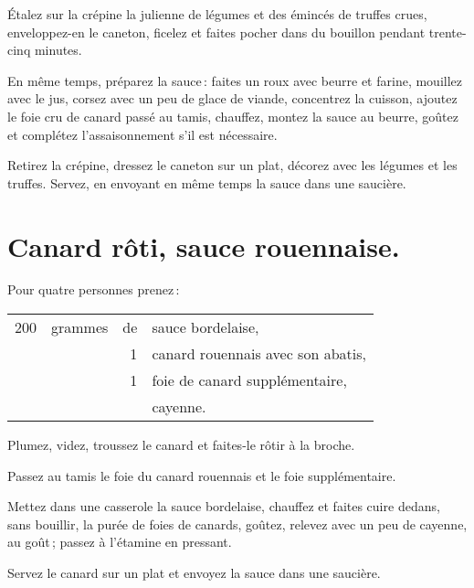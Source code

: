 Étalez sur la crépine la julienne de légumes et des émincés de truffes crues,
enveloppez-en le caneton, ficelez et faites pocher dans du bouillon pendant
trente-cinq minutes.

En même temps, préparez la sauce : faites un roux avec beurre et farine,
mouillez avec le jus, corsez avec un peu de glace de viande, concentrez la
cuisson, ajoutez le foie cru de canard passé au tamis, chauffez, montez la
sauce au beurre, goûtez et complétez l'assaisonnement s'il est nécessaire.

Retirez la crépine, dressez le caneton sur un plat, décorez avec les légumes et
les truffes. Servez, en envoyant en même temps la sauce dans une saucière.

\section*{\centering Canard rôti, sauce rouennaise.}
{}

Pour quatre personnes prenez :

\medskip

\footnotesize
\begin{longtable}{rrrp{16em}}
    200 & grammes & de & sauce bordelaise,                                                                \\
        &         &  1 & canard rouennais avec son abatis,                                                \\
        &         &  1 & foie de canard supplémentaire,                                                   \\
        &         &    & cayenne.                                                                         \\
\end{longtable}
\normalsize

Plumez, videz, troussez le canard et faites-le rôtir à la broche.

Passez au tamis le foie du canard rouennais et le foie supplémentaire.

Mettez dans une casserole la sauce bordelaise, chauffez et faites cuire dedans,
sans bouillir, la purée de foies de canards, goûtez, relevez avec un peu de
cayenne, au goût ; passez à l'étamine en pressant.

Servez le canard sur un plat et envoyez la sauce dans une saucière.

